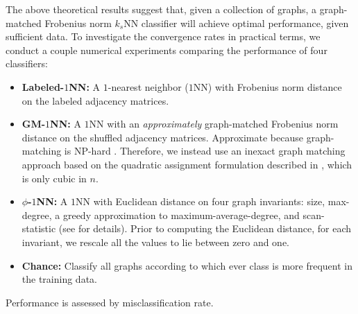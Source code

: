 The above theoretical results suggest that, given a collection of graphs, a graph-matched Frobenius norm $k_s$NN classifier will achieve optimal performance, given sufficient data.  To investigate the convergence rates in practical terms, we conduct a couple numerical experiments comparing the performance of four classifiers:
\begin{itemize}
	\item \textbf{Labeled-$1$NN:}  A $1$-nearest neighbor ($1$NN) with Frobenius norm distance on the labeled adjacency matrices.
	\item \textbf{GM-$1$NN:} A $1$NN with an \emph{approximately} graph-matched Frobenius norm distance on the shuffled adjacency matrices.  Approximate because graph-matching is NP-hard \cite{Garey1979}.  Therefore, we instead use an inexact graph matching approach based on the quadratic assignment formulation described in \cite{VP11_QAP}, which is only cubic in $n$.
	\item \textbf{$\phi$-$1$NN:} A $1$NN with Euclidean distance on four graph invariants:  size, max-degree, a greedy approximation to maximum-average-degree, and scan-statistic (see \cite{PCP10} for details).   Prior to computing the Euclidean distance, for each invariant, we rescale all the values to lie between zero and one.
	\item \textbf{Chance:} Classify all graphs according to which ever class is more frequent in the training data.
\end{itemize}
Performance is assessed by misclassification rate.

% 
% 
% 

